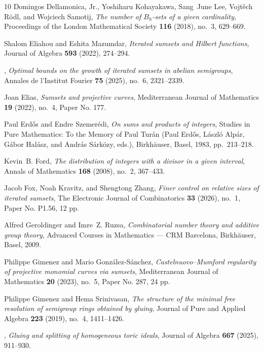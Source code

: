 \documentclass[11pt,reqno]{amsart}
\theoremstyle{definition}
\theoremstyle{remark}
\begin{document}
\begin{sloppypar}
\begin{thebibliography}{10}
Domingos Dellamonica, Jr., Yoshiharu Kohayakawa, Sang~June Lee, Vojt\v{e}ch R\"odl, and Wojciech Samotij, \emph{The number of {$B_h$}-sets of a given cardinality}, Proceedings of the London Mathematical Society \textbf{116} (2018), no.~3, 629--669.

Shalom Eliahou and Eshita Mazumdar, \emph{Iterated sumsets and {Hilbert} functions}, Journal of Algebra \textbf{593} (2022), 274--294.

\bysame, \emph{Optimal bounds on the growth of iterated sumsets in abelian semigroups}, Annales de l'Institut Fourier \textbf{75} (2025), no.~6, 2321--2339.

Joan Elias, \emph{Sumsets and projective curves}, Mediterranean Journal of Mathematics \textbf{19} (2022), no.~4, Paper No. 177.

Paul Erd\H{o}s and Endre Szemer\'{e}di, \emph{On sums and products of integers}, Studies in Pure Mathematics: To the Memory of Paul Tur\'an (Paul Erd\H{o}s, L\'aszl\'o Alp\'ar, G\'abor Hal\'asz, and Andr\'as S\'ark\"ozy, eds.), Birkh\"auser, Basel, 1983, pp.~213--218.

Kevin~B. Ford, \emph{The distribution of integers with a divisor in a given interval}, Annals of Mathematics \textbf{168} (2008), no.~2, 367--433.

Jacob Fox, Noah Kravitz, and Shengtong Zhang, \emph{Finer control on relative sizes of iterated sumsets}, The Electronic Journal of Combinatorics \textbf{33} (2026), no.~1, Paper No. P1.56, 12 pp.

Alfred Geroldinger and Imre~Z. Ruzsa, \emph{Combinatorial number theory and additive group theory}, Advanced Courses in Mathematics --- CRM Barcelona, Birkh\"auser, Basel, 2009.

Philippe Gimenez and Mario Gonz\'alez-S\'anchez, \emph{{Castelnuovo--Mumford} regularity of projective monomial curves via sumsets}, Mediterranean Journal of Mathematics \textbf{20} (2023), no.~5, Paper No. 287, 24 pp.

Philippe Gimenez and Hema Srinivasan, \emph{The structure of the minimal free resolution of semigroup rings obtained by gluing}, Journal of Pure and Applied Algebra \textbf{223} (2019), no.~4, 1411--1426.

\bysame, \emph{Gluing and splitting of homogeneous toric ideals}, Journal of Algebra \textbf{667} (2025), 911--930.


\end{thebibliography}
\end{sloppypar}
\end{document}
